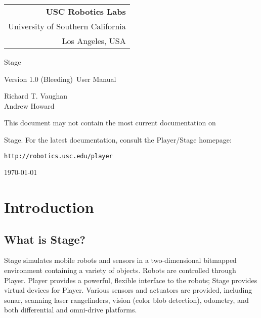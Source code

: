 \documentclass[11pt]{report}
\def\VERSION {1.0 (Bleeding)}
\begin{document}
\setcounter{page}{0}

\titlepage

\begin{flushright}
\begin{tabular}{r}
{\bf USC Robotics Labs}\\
University of Southern California\\
Los Angeles, USA\\
\end{tabular}
\end{flushright}

\vspace{6cm}
\centerline{\huge{Stage}}
\vspace{0.5cm}
\centerline{\large{Version \VERSION\ User Manual}}
\vspace{2cm}

\centerline{\large Richard T. Vaughan \\ Andrew Howard}
\vspace{1cm}

\centerline{This document may not contain the most current documentation on}
\centerline{Stage.  For the latest documentation, consult the Player/Stage homepage:}
\centerline{{\tt http://robotics.usc.edu/player}}

\vspace{4cm}

\centerline{\today}


\setcounter{page}{0}


\chapter{Introduction}

  \section{What is Stage?}

    Stage simulates mobile robots and sensors in a two-dimensional
    bitmapped environment containing a variety of objects. Robots are
    controlled through Player. Player provides a powerful, flexible
    interface to the robots; Stage provides virtual devices for
    Player.  Various sensors and actuators are provided, including
    sonar, scanning laser rangefinders, vision (color blob detection),
    odometry, and both differential and omni-drive platforms.
\end{document}
